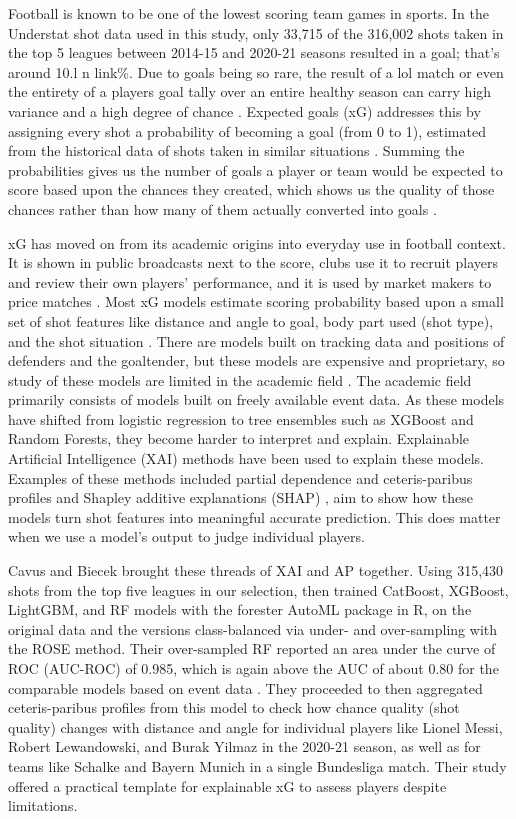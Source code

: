 \documentclass[conference]{IEEEtran}
\begin{document}
Football is known to be one of the lowest scoring team games in sports. In the Understat shot data used in this study, only 33,715 of the 316,002 shots taken in the top 5 leagues between 2014-15 and 2020-21 seasons resulted in a goal; that's around 10.l n link\%. Due to goals being so rare, the result of a lol match or even the entirety of a players goal tally over an entire healthy season can carry high variance and a high degree of chance \cite{mead2023}. Expected goals (xG) addresses this by assigning every shot a probability of becoming a goal (from 0 to 1), estimated from the historical data of shots taken in similar situations \cite{anzer2021}. Summing the probabilities gives us the number of goals a player or team would be expected to score based upon the chances they created, which shows us the quality of those chances rather than how many of them actually converted into goals \cite{anzer2021}.

xG has moved on from its academic origins into everyday use in football context. It is shown in public broadcasts next to the score, clubs use it to recruit players and review their own players' performance, and it is used by market makers to price matches \cite{mead2023}. Most xG models estimate scoring probability based upon a small set of shot features like distance and angle to goal, body part used (shot type), and the shot situation \cite{mead2023}. There are models built on tracking data and positions of defenders and the goaltender, but these models are expensive and proprietary, so study of these models are limited in the academic field \cite{anzer2021}. The academic field primarily consists of models built on freely available event data. As these models have shifted from logistic regression to tree ensembles such as XGBoost and Random Forests, they become harder to interpret and explain. Explainable Artificial Intelligence (XAI) methods have been used to explain these models. Examples of these methods included partial dependence and ceteris-paribus profiles \cite{cavus2022} and Shapley additive explanations (SHAP) \cite{anzer2021}, aim to show how these models turn shot features into meaningful accurate prediction. This does matter when we use a model's output to judge individual players.

Cavus and Biecek \cite{cavus2022} brought these threads of XAI and AP together. Using 315,430 shots from the top five leagues in our selection, then trained CatBoost, XGBoost, LightGBM, and RF models with the forester AutoML package in R, on the original data and the versions class-balanced via under- and over-sampling with the ROSE method. Their over-sampled RF reported an area under the curve of ROC (AUC-ROC) of 0.985, which is again above the AUC of about 0.80 for the comparable models based on event data \cite{mead2023}. They proceeded to then aggregated ceteris-paribus profiles from this model to check how chance quality (shot quality) changes with distance and angle for individual players like Lionel Messi, Robert Lewandowski, and Burak Yilmaz in the 2020-21 season, as well as for teams like Schalke and Bayern Munich in a single Bundesliga match. Their study offered a practical template for explainable xG to assess players despite limitations.
\end{document}
